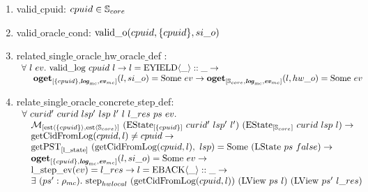 \begin{figure}
\begin{enumerate}
\item valid$\_$cpuid: $cpuid \in {\mathbb{S}_{core}}$
\item valid$\_$oracle$\_$cond: ${\mathrm{valid}\_\mathrm{o}}({cpuid}, {\{cpuid\}}, {si\_o})$
\item related$\_$single$\_$oracle$\_$hw$\_$oracle$\_$def : \\
$
\begin{array}{l}
\forall \ l \ ev  . \ {{\mathrm{valid}\_\mathrm{log}}~{cpuid}~{l}} \rightarrow l = {{{{\mathrm{EYIELD}}\langle{\_}\rangle}}::{\_}} \rightarrow\\
\ \ \ \ {{{\mathrm{\textbf{oget}}}_{[{\{cpuid\}}, {{\mathrm{\textbf{\textit{log}}}_{\mathrm{mc}}}}, {{\mathrm{\textbf{\textit{ev}}}_{mc}}}]}({l}, {si\_o})} = \mathrm{Some} \ {ev}} \rightarrow {{{\mathrm{\textbf{oget}}}_{[{{\mathbb{S}_{core}}}, {{\mathrm{\textbf{\textit{log}}}_{\mathrm{mc}}}}, {{\mathrm{\textbf{\textit{ev}}}_{mc}}}]}({l}, {hw\_o})} = \mathrm{Some} \ {ev}} \\
\end{array}
$
\item relate$\_$single$\_$oracle$\_$concrete$\_$step$\_$def: \\ 
$
\begin{array}{l}
\forall \ curid' \ curid \ lsp' \ lsp \ l' \ l \ l\_res \ ps \ ev  . \\
\ \ \ \matchestateestate{\set{cpuid}}{(\envstate{\set{cpuid}}{curid'}{lsp'}{l'})}{(\envstate{\coreset}{curid}{lsp}{l})} \rightarrow\\
\ \ \ \getcuridfromlognoeq{cpuid}{l} \neq cpuid \rightarrow \\
\ \ \ \getpstsome{\localstatekwd}{\getcuridfromlognoeq{cpuid}{l}}{lsp}{(\localstate{ps}{false})} \rightarrow \\
\ \ \ \oget{\set{cpuid}}{\mclog}{\mcevent}{l}{si\_o}{ev} \rightarrow \\
\ \ \ \localstepev{ev}{l\_res} \rightarrow l = \listcons{\yieldbackev{\_}}{\_} \rightarrow \\
\ \ \ \exists\ (ps' : \privatestate) . \ \hardwarelocalstep{(\getcuridfromlognoeq{cpuid}{l})}{(\localview{ps}{l})}{(\localview{ps'}{l\_res})} \\
\end{array}
$
\end{enumerate}




\end{figure}
